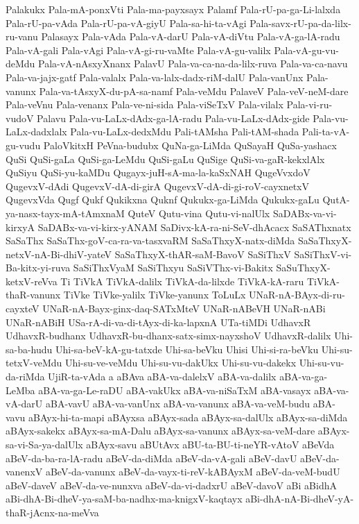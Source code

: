 {Palakukx
Pala-mA-ponxVti
Pala-ma-payxsayx
Palamf
Pala-rU-pa-ga-Li-lalxda
Pala-rU-pa-vAda
Pala-rU-pa-vA-giyU
Pala-sa-hi-ta-vAgi
Pala-savx-rU-pa-da-lilx-ru-vanu
Palasayx
Pala-vAda
Pala-vA-darU
Pala-vA-diVtu
Pala-vA-ga-lA-radu
Pala-vA-gali
Pala-vAgi
Pala-vA-gi-ru-vaMte
Pala-vA-gu-valilx
Pala-vA-gu-vu-deMdu
Pala-vA-nAsxyXnanx
PalavU
Pala-va-ca-na-da-lilx-ruva
Pala-va-ca-navu
Pala-va-jajx-gatf
Pala-valalx
Pala-va-lalx-dadx-riM-dalU
Pala-vanUnx
Pala-vanunx
Pala-va-tAsxyX-du-pA-sa-namf
Pala-veMdu
PalaveV
Pala-veV-neM-dare
Pala-veVnu
Pala-venanx
Pala-ve-ni-sida
Pala-viSeTxV
Pala-vilalx
Pala-vi-ru-vudoV
Palavu
Pala-vu-LaLx-dAdx-ga-lA-radu
Pala-vu-LaLx-dAdx-gide
Pala-vu-LaLx-dadxlalx
Pala-vu-LaLx-dedxMdu
Pali-tAMsha
Pali-tAM-shada
Pali-ta-vA-gu-vudu
PaloVkitxH
PeVna-budubx
QuNa-ga-LiMda
QuSayaH
QuSa-yashacx
QuSi
QuSi-gaLa
QuSi-ga-LeMdu
QuSi-gaLu
QuSige
QuSi-va-gaR-kekxlAlx
QuSiyu
QuSi-yu-kaMDu
Qugayx-juH-sA-ma-la-kaSxNAH
QugeVvxdoV
QugevxV-dAdi
QugevxV-dA-di-girA
QugevxV-dA-di-gi-roV-cayxnetxV
QugevxVda
Qugf
Qukf
Qukikxna
Quknf
Qukukx-ga-LiMda
Qukukx-gaLu
QutA-ya-nasx-tayx-mA-tAmxnaM
QuteV
Qutu-vina
Qutu-vi-nalUlx
SaDABx-va-vi-kirxyA
SaDABx-va-vi-kirx-yANAM
SaDivx-kA-ra-ni-SeV-dhAcacx
SaSAThxnatx
SaSaThx
SaSaThx-goV-ca-ra-va-tasxvaRM
SaSaThxyX-natx-diMda
SaSaThxyX-netxV-nA-Bi-dhiV-yateV
SaSaThxyX-thAR-saM-BavoV
SaSiThxV
SaSiThxV-vi-Ba-kitx-yi-ruva
SaSiThxVyaM
SaSiThxyu
SaSiVThx-vi-Bakitx
SaSuThxyX-ketxV-reVva
Ti
TiVkA
TiVkA-dalilx
TiVkA-da-lilxde
TiVkA-kA-raru
TiVkA-thaR-vanunx
TiVke
TiVke-yalilx
TiVke-yanunx
ToLuLx
UNaR-nA-BAyx-di-ru-cayxteV
UNaR-nA-Bayx-ginx-daq-SATxMteV
UNaR-nABeVH
UNaR-nABi
UNaR-nABiH
USa-rA-di-va-di-tAyx-di-ka-lapxnA
UTa-tiMDi
UdhavxR
UdhavxR-budhanx
UdhavxR-bu-dhanx-satx-simx-nayxshoV
UdhavxR-dalilx
Uhi-sa-ba-hudu
Uhi-sa-beV-kA-gu-tatxde
Uhi-sa-beVku
Uhisi
Uhi-si-ra-beVku
Uhi-su-tetxV-veMdu
Uhi-su-ve-veMdu
Uhi-su-vu-dakUkx
Uhi-su-vu-dakekx
Uhi-su-vu-da-riMda
UjiR-ta-vAda
a
aBAva
aBA-va-dalelxV
aBA-va-dalilx
aBA-va-ga-LeMba
aBA-va-ga-Le-raDU
aBA-vakUkx
aBA-va-niSaTxM
aBA-vasayx
aBA-va-vA-darU
aBA-vavU
aBA-va-vanUnx
aBA-va-vanunx
aBA-va-veM-budu
aBA-vavu
aBAyx-hi-ta-mapi
aBAyxsa
aBAyx-sada
aBAyx-sa-dalUlx
aBAyx-sa-diMda
aBAyx-sakekx
aBAyx-sa-mA-Dalu
aBAyx-sa-vanunx
aBAyx-sa-veM-dare
aBAyx-sa-vi-Sa-ya-dalUlx
aBAyx-savu
aBUtAvx
aBU-ta-BU-ti-neYR-vAtoV
aBeVda
aBeV-da-ba-ra-lA-radu
aBeV-da-diMda
aBeV-da-vA-gali
aBeV-davU
aBeV-da-vanenxV
aBeV-da-vanunx
aBeV-da-vayx-ti-reV-kABAyxM
aBeV-da-veM-budU
aBeV-daveV
aBeV-da-ve-nunxva
aBeV-da-vi-dadxrU
aBeV-davoV
aBi
aBidhA
aBi-dhA-Bi-dheV-ya-saM-ba-nadhx-ma-knigxV-kaqtayx
aBi-dhA-nA-Bi-dheV-yA-thaR-jAcnx-na-meVva
}
